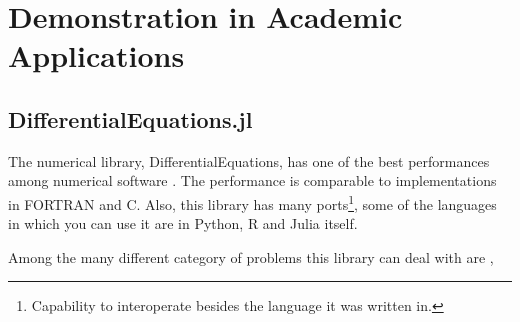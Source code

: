 \documentclass[
12pt,				%
openright,			%
oneside,			%
a4paper,			%
brazil,				%
english,			%
]{abntex2}
\begin{document}
\section{Demonstration in Academic Applications}

\subsection{DifferentialEquations.jl}

The numerical library, DifferentialEquations, has one of the best
performances among numerical software
\cite{rackauckas2017differentialequations}. The performance is
comparable to implementations in FORTRAN and C. Also, this library has
many ports\footnote{Capability to interoperate besides the language it
was written in.}, some of the languages in which you can use it are in Python, R and Julia itself.

Among the many different category of problems this library can deal
with are \cite{rackauckas2019confederated,rackauckas2017adaptive,rackauckas_stability-optimized_2018,sykora2020stochasticdelaydiffeq,rackauckas2018comparison,rackauckas2019diffeqflux,rackauckas2020universal,gowda2019sparsity,ma2021modelingtoolkit},
\end{document}
